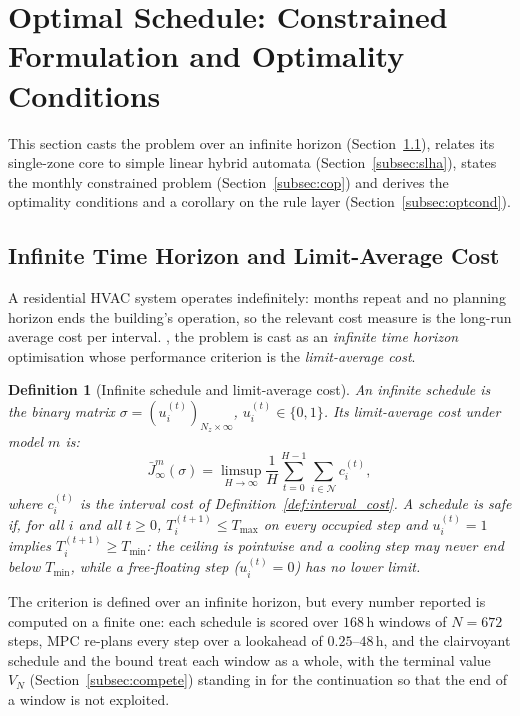 \documentclass[pdflatex,sn-mathphys-num,iicol]{sn-jnl}
\theoremstyle{thmstyleone}\newtheorem{proposition}{Proposition}\newtheorem{corollary}{Corollary}
\theoremstyle{thmstyletwo}\newtheorem{remark}{Remark}\newtheorem{observation}{Observation}
\theoremstyle{thmstylethree}\newtheorem{definition}{Definition}
\newcommand{\sched}{\sigma}
\newcommand{\Tmin}{T_{\min}}
\newcommand{\Tmax}{T_{\max}}
\begin{document}
\section{Optimal Schedule: Constrained Formulation and Optimality Conditions}
\label{sec:schedule}

This section casts the problem over an infinite horizon (Section~\ref{subsec:infinite}), relates its single-zone core to simple linear hybrid automata (Section~\ref{subsec:slha}), states the monthly constrained problem (Section~\ref{subsec:cop}) and derives the optimality conditions and a corollary on the rule layer (Section~\ref{subsec:optcond}).
 
\subsection{Infinite Time Horizon and Limit-Average Cost}
\label{subsec:infinite}
 
A residential HVAC system operates indefinitely: months repeat and no planning horizon ends the building's operation, so the relevant cost measure is the long-run average cost per interval. \citet{Mousa2016}, the problem is cast as an \emph{infinite time horizon} optimisation whose performance criterion is the \emph{limit-average cost}.
 
\begin{definition}[Infinite schedule and limit-average cost]
\label{def:inf_schedule}
An \emph{infinite schedule} is the binary matrix $\sched=(u_i^{(t)})_{N_z\times\infty}$, $u_i^{(t)}\in\{0,1\}$. Its limit-average cost under model $m$ is:
\begin{equation}
  \bar{J}^m_\infty(\sched)
  = \limsup_{H\to\infty}
    \frac{1}{H}\sum_{t=0}^{H-1}\sum_{i\in\mathcal{N}} c_i^{(t)},
  \label{eq:limsup}
\end{equation}
where $c_i^{(t)}$ is the interval cost of Definition~\ref{def:interval_cost}. A schedule is \emph{safe} if, for all $i$ and all $t\ge0$, $T_i^{(t+1)}\le\Tmax$ on every occupied step and $u_i^{(t)}=1$ implies $T_i^{(t+1)}\ge\Tmin$: the ceiling is pointwise and a cooling step may never end below $\Tmin$, while a free-floating step ($u_i^{(t)}=0$) has no lower limit.
\end{definition}

The criterion is defined over an infinite horizon, but every number reported is computed on a finite one: each schedule is scored over $168\,$h windows of $N=672$ steps, MPC re-plans every step over a lookahead of $0.25$--$48\,$h, and the clairvoyant schedule and the bound treat each window as a whole, with the terminal value $V_N$ (Section~\ref{subsec:compete}) standing in for the continuation so that the end of a window is not exploited.
\end{document}
